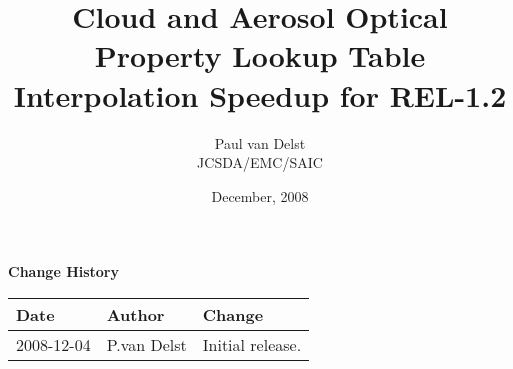 


\title{Cloud and Aerosol Optical Property Lookup Table Interpolation Speedup for REL-1.2}
\author{Paul van Delst\\JCSDA/EMC/SAIC}
\date{December, 2008}



\maketitle


\thispagestyle{empty}
\vspace*{10cm}
\begin{center}
  {\sffamily\Large\bfseries Change History}
  \begin{table}[htp]
    \centering
    \begin{tabular}{|p{2cm}|p{3cm}|p{8cm}|}
      \hline
      \sffamily\textbf{Date} & \sffamily\textbf{Author} & \sffamily\textbf{Change}\\
      \hline\hline
      2008-12-04 & P.van Delst & Initial release.\\
      \hline
    \end{tabular}
  \end{table}
\end{center}
\clearpage
{}
\setcounter{page}{1}











%
%





